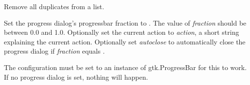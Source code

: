 \documentclass[letterpaper,10pt,english]{sphinxmanual}
\begin{document}

\begin{fulllineitems}
\label{setlyze/std:setlyze.std.uniqify}
Remove all duplicates from a list.

\end{fulllineitems}


\begin{fulllineitems}
\label{setlyze/std:setlyze.std.update_progress_dialog}
Set the progress dialog's progressbar fraction to .
The value of \emph{fraction} should be between 0.0 and 1.0. Optionally set
the current action to \emph{action}, a short string explaining the current
action. Optionally set \emph{autoclose} to automatically close the
progress dialog if \emph{fraction} equals .

The  configuration must be set to an instance of
gtk.ProgressBar for this to work. If no progress dialog is set,
nothing will happen.

\end{fulllineitems}

\end{document}
